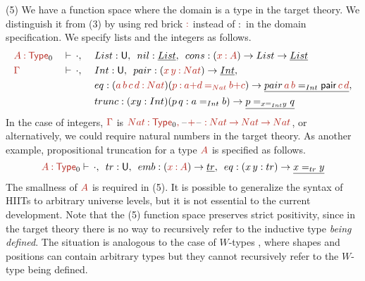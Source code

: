 \documentclass[a4paper,UKenglish]{lipics-v2018}
\newcommand{\U}{\mathsf{U}}
\newcommand{\ra}{\rightarrow}
\newcommand{\blank}{\mathord{\hspace{1pt}\text{--}\hspace{1pt}}} %
\newcommand{\1}{\mathsf{1}} \renewcommand{\Pr}{\mathsf{Pr}}
\renewcommand{\in}{\mathbin{\hat:}}
\renewcommand{\hat}[1]{{\color{BrickRed}{#1}}}
\newcommand{\rah}{\mathbin{\hat\ra}}
\newcommand{\eqh}{\mathbin{\hat=}}
\newcommand{\Type}{\hat{\mathsf{Type}}}
\begin{document}
(5) We have a function space where the domain is a type in the target
theory. We distinguish it from (3) by using red brick $\in$ instead of
$:$ in the domain specification. We specify lists and the integers as follows.
\begin{alignat*}{4}
  & \hat{A}\in\Type_0 && \vdash\,\cdot,\,\, && List:\U,\,\,\,nil:\underline{List},\,\,\,cons:(\hat{x}\in \hat{A})\ra List\ra\underline{List} \\
  & \hat{\Gamma} && \vdash\,\cdot,\,\,&& Int:\U,\,\,\,pair:(\hat{x}\,\hat{y}\in\hat{Nat})\ra\underline{Int},\,\,\, \\
  & && && eq:(\hat{a}\,\hat{b}\,\hat{c}\,\hat{d}\in \hat{Nat})(\hat{p}\in \hat{a}\hat{\mathbin{+}}\hat{d}\eqh_{\hat{Nat}} \hat{b}\hat{\mathbin{+}}\hat{c})\ra \underline{pair\,\hat{a}\,\hat{b}=_{Int}\mathsf{pair}\,\hat{c}\,\hat{d}}, \\
  & && && trunc:(x y : Int)(p\,q : a=_{Int} b)\ra \underline{p=_{x=_{Int} y} q}
\end{alignat*}
In the case of integers, $\hat{\Gamma}$ is
$\hat{Nat}\in\Type_0\hat{,}\,\blank\hat{\mathbin{+}}\blank\in\hat{Nat}\rah
\hat{Nat}\rah\hat{Nat}$, or alternatively, we could require natural
numbers in the target theory. As another example, propositional
truncation for a type $\hat{A}$ is specified as follows.
\[
\hat{A}\in\Type_0\vdash\, \cdot,\,\,\,tr:\U,\,\,\,emb : (\hat{x}\in \hat{A})\ra \underline{tr},\,\,\,eq:(x\,y:tr)\ra \underline{x=_{tr} y}
\]
The smallness of $\hat{A}$ is required in (5). It is possible to
generalize the syntax of HIITs to arbitrary universe levels, but it is
not essential to the current development. Note that the (5) function
space preserves strict positivity, since in the target theory there is
no way to recursively refer to the inductive type \emph{being
  defined}. The situation is analogous to the case of $W$-types
\cite{abbot05containers}, where shapes and positions can contain
arbitrary types but they cannot recursively refer to the $W$-type
being defined.
\end{document}
